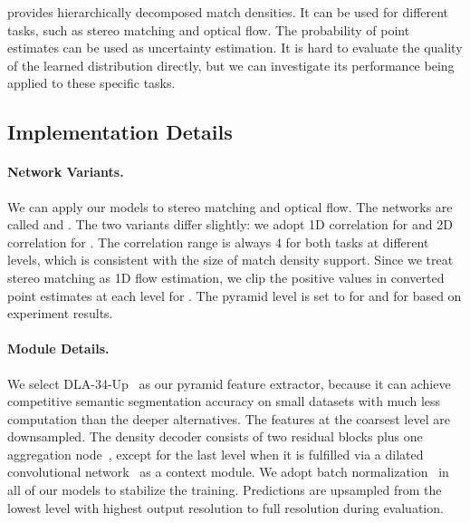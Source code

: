 \modelname provides hierarchically decomposed match densities. It can be used for different tasks, such as stereo matching and optical flow. The probability of point estimates can be used as uncertainty estimation. 
It is hard to evaluate the quality of the learned distribution directly, but we can investigate its performance being applied to these specific tasks.

\subsection{Implementation Details}
\paragraph{Network Variants.}
We can apply our models to stereo matching and optical flow. 
The networks are called \stereomodelname and \flowmodelname.
The two variants differ slightly: we adopt 1D correlation for \stereomodelname and 2D correlation for \flowmodelname. 
The correlation range is always 4 for both tasks at different levels, which is consistent with the size of match density support. 
Since we treat stereo matching as 1D flow estimation, we clip the positive values in converted point estimates at each level for \stereomodelname. 
The pyramid level is set to  for \flowmodelname and  for \stereomodelname based on experiment results.

\paragraph{Module Details.}
We select DLA-34-Up~\cite{yu2018deep} as our pyramid feature extractor, because it can achieve competitive semantic segmentation accuracy on small datasets with much less computation than the deeper alternatives.
The features at the coarsest level are  downsampled.
The density decoder  consists of two residual blocks plus one aggregation node~\cite{he2016identity, yu2018deep}, except for the last level when it is fulfilled via a dilated convolutional network~\cite{yu2015multi} as a context module.
We adopt batch normalization~\cite{ioffe2015batch} in all of our models to stabilize the training. 
Predictions are upsampled from the lowest level with highest output resolution to full resolution during evaluation.


